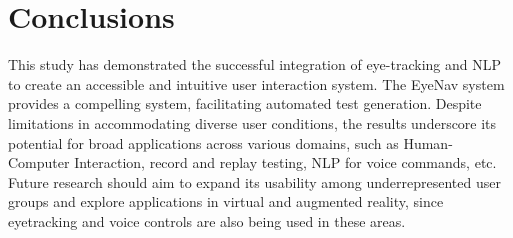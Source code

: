 \section{Conclusions}

This study has demonstrated the successful integration of eye-tracking and NLP to create an accessible and intuitive user interaction system. The EyeNav system provides a compelling system, facilitating automated test generation. Despite limitations in accommodating diverse user conditions, the results underscore its potential for broad applications across various domains, such as Human-Computer Interaction, record and replay testing, NLP for voice commands, etc. Future research should aim to expand its usability among underrepresented user groups and explore applications in virtual and augmented reality, since eyetracking and voice controls are also being used in these areas.